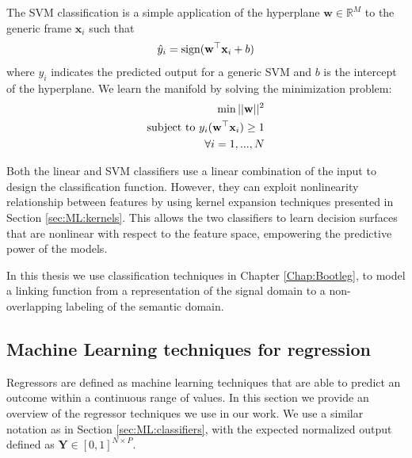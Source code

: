 The SVM classification is a simple application of the hyperplane $\mathbf{w}\in \mathbb{R}^{M}$ to the generic frame $\mathbf{x}_i$ such that
\begin{equation}
\hat{y}_i=\text{sign}(\mathbf{w}^\top \mathbf{x}_i + b)
\end{equation}
where $y_i$ indicates the predicted output for a generic SVM and $b$ is the intercept of the hyperplane. We learn the manifold by solving the minimization problem:
\begin{equation}
\begin{split}
\min  ||\mathbf{w}||^2\\
\text{subject to  } y_i(\mathbf{w}^\top \mathbf{x}_i)\geq 1 \\
\forall i=1,...,N
\end{split}
\label{eq:ML:SVM}
\end{equation}


Both the linear and SVM classifiers use a linear combination of the input to design the classification function. However, they can exploit nonlinearity relationship between features by using kernel expansion techniques presented in Section \ref{sec:ML:kernels}. This allows the two classifiers to learn decision surfaces that are nonlinear with respect to the feature space, empowering the predictive power of the models.


In this thesis we use classification techniques in Chapter \ref{Chap:Bootleg}, to model a linking function from a representation of the signal domain to a non-overlapping labeling of the semantic domain.


\subsection{Machine Learning techniques for regression}\label{sec:ML:semantics}
Regressors are defined as machine learning techniques that are able to predict an outcome within a continuous range of values. In this section we provide an overview of the regressor techniques we use in our work. We use a similar notation as in Section \ref{sec:ML:classifiers}, with the expected normalized output defined as $\mathbf{Y}\in [0,1]^{N \times P}$.

